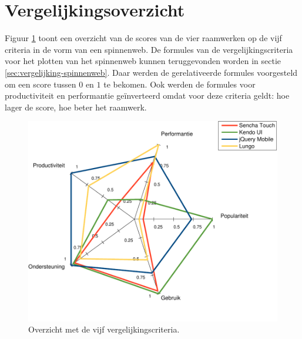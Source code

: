 \section{Vergelijkingsoverzicht}
\label{sec:evaluatie-spinnenweb}

Figuur \ref{fig:spinnenweb-final} toont een overzicht van de scores van de vier raamwerken op de vijf criteria in de vorm van een spinnenweb.
De formules van de vergelijkingscriteria voor het plotten van het spinnenweb kunnen teruggevonden worden in sectie \ref{sec:vergelijking-spinnenweb}.
Daar werden de gerelativeerde formules voorgesteld om een score tussen $0$ en $1$ te bekomen.
Ook werden de formules voor productiviteit en performantie geïnverteerd omdat voor deze criteria geldt:  hoe lager de score, hoe beter het raamwerk.

\begin{figure}
  \centering
  \includegraphics[width=\textwidth]{figuren/spidergraph-final-nl.pdf}
  \caption{Overzicht met de vijf vergelijkingscriteria.}
  \label{fig:spinnenweb-final}
\end{figure}



     
